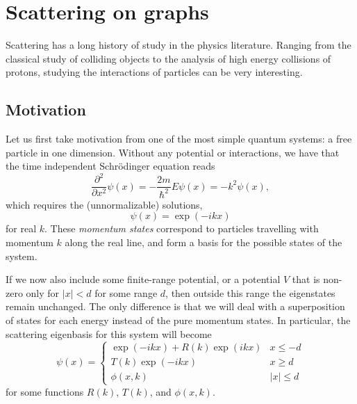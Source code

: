 \documentclass[../thesis-main/thesis-main]{subfiles}
\begin{document}
\chapter{Scattering on graphs}

Scattering has a long history of study in the physics literature.  Ranging from the classical study of colliding objects to the analysis of high energy collisions of protons, studying the interactions of particles can be very interesting.


\section{Motivation}


Let us first take motivation from one of the most simple quantum systems: a free particle in one dimension.  Without any potential or interactions, we have that the time independent Schr\"{o}dinger equation reads
\begin{equation}
  \frac{\partial^2}{\partial x^2} \psi(x) = -\frac{2m}{\hbar^2}E \psi(x) = -k^2 \psi(x),
\end{equation}
which requires the (unnormalizable) solutions,
\begin{equation}
  \psi(x) = \exp(- i k x) 
\end{equation}
for real $k$.  These \textit{momentum states} correspond to particles travelling with momentum $k$ along the real line, and form a basis for the possible states of the system.


If we now also include some finite-range potential, or a potential $V$ that is non-zero only for $|x| < d$ for some range $d$, then outside this range the eigenstates remain unchanged.  The only difference is that we will deal with a superposition of states for each energy instead of the pure momentum states.  In particular, the scattering eigenbasis for this system will become
\begin{equation}
  \psi(x) = \begin{cases}
    \exp(-i k x) + R(k) \exp(i k x) & x \leq -d\\
    T(k) \exp(- i k x) & x \geq d\\
    \phi(x,k) & |x| \leq d
    \end{cases}
\end{equation}
for some functions $R(k)$, $T(k)$, and $\phi(x,k)$.  
\end{document}
